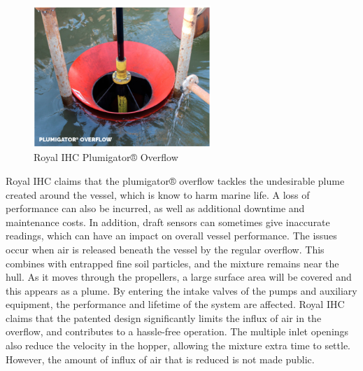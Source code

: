 \begin{figure}[ht!]
    \centering
    \includegraphics[width =0.6\textwidth]{Images/IHC.png}
    \caption{Royal IHC Plumigator® Overflow}
    \label{fig:IHC}
\end{figure}

\noindent Royal IHC claims that the plumigator® overflow tackles the undesirable plume created around the vessel, which is know to harm marine life. A loss of performance can also be incurred, as well as additional downtime and maintenance costs. In addition, draft sensors can sometimes give inaccurate readings, which can have an impact on overall vessel performance. \newline 
\noindent The issues occur when air is released beneath the vessel by the regular overflow. This combines with entrapped fine soil particles, and the mixture remains near the hull.
As it moves through the propellers, a large surface area will be covered and this appears as a plume. By entering the intake valves of the pumps and auxiliary equipment, the performance and lifetime of the system are affected. \newline
\noindent Royal IHC claims that the patented design significantly limits the influx of air in the overflow, and contributes to a hassle-free operation. The multiple inlet openings also reduce the velocity in the hopper, allowing the mixture extra time to settle. However, the amount of influx of air that is reduced is not made public.